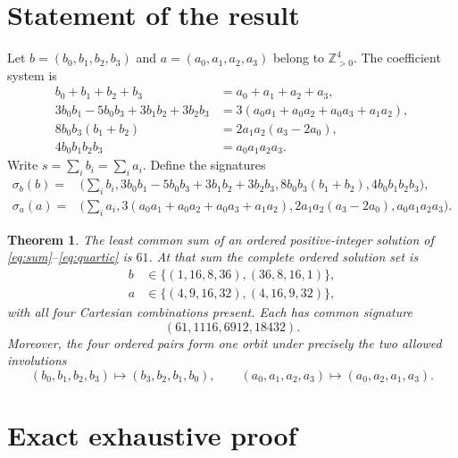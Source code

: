 \documentclass[11pt]{article}
\newtheorem{theorem}{Theorem}
\newcommand{\Zpos}{\mathbb Z_{>0}}
\begin{document}
\section{Statement of the result}

Let $b=(b_0,b_1,b_2,b_3)$ and $a=(a_0,a_1,a_2,a_3)$ belong to
$\Zpos^4$.  The coefficient system is
\begin{align}
 b_0+b_1+b_2+b_3
   &=a_0+a_1+a_2+a_3,                                      \label{eq:sum}\\
 3b_0b_1-5b_0b_3+3b_1b_2+3b_2b_3
   &=3(a_0a_1+a_0a_2+a_0a_3+a_1a_2),                      \label{eq:quad}\\
 8b_0b_3(b_1+b_2)
   &=2a_1a_2(a_3-2a_0),                                    \label{eq:cubic}\\
 4b_0b_1b_2b_3
   &=a_0a_1a_2a_3.                                         \label{eq:quartic}
\end{align}
Write $s=\sum_i b_i=\sum_i a_i$.  Define the signatures
\begin{align*}
 \sigma_b(b)={}&\bigl(
  \textstyle\sum_i b_i,
  3b_0b_1-5b_0b_3+3b_1b_2+3b_2b_3,
  8b_0b_3(b_1+b_2),
  4b_0b_1b_2b_3\bigr),\\
 \sigma_a(a)={}&\bigl(
  \textstyle\sum_i a_i,
  3(a_0a_1+a_0a_2+a_0a_3+a_1a_2),
  2a_1a_2(a_3-2a_0),
  a_0a_1a_2a_3\bigr).
\end{align*}

\begin{theorem}\label{thm:main}
The least common sum of an ordered positive-integer solution of
\eqref{eq:sum}--\eqref{eq:quartic} is $61$.  At that sum the complete ordered
solution set is
\begin{equation}\label{eq:solutions}
 \begin{split}
 b&\in\{(1,16,8,36),(36,8,16,1)\},\\
 a&\in\{(4,9,16,32),(4,16,9,32)\},
 \end{split}
\end{equation}
with all four Cartesian combinations present.  Each has common signature
\[
 (61,1116,6912,18432).
\]
Moreover, the four ordered pairs form one orbit under precisely the two
allowed involutions
\[
 (b_0,b_1,b_2,b_3)\longmapsto(b_3,b_2,b_1,b_0),\qquad
 (a_0,a_1,a_2,a_3)\longmapsto(a_0,a_2,a_1,a_3).
\]
\end{theorem}

\section{Exact exhaustive proof}
\end{document}
